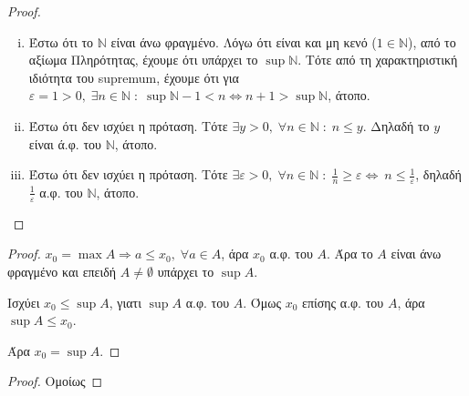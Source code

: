 \documentclass[main.tex]{subfiles}
\begin{document}
\begin{proof}
\item {}
    \begin{enumerate}[i)]
        \item Έστω ότι το $ \mathbb{N} $ είναι άνω φραγμένο. Λόγω ότι 
            είναι και μη κενό ($ 1 \in \mathbb{N} $), από το αξίωμα 
            Πληρότητας, έχουμε ότι υπάρχει το $ \sup \mathbb{N} $. 
            Τότε από τη χαρακτηριστική ιδιότητα του supremum, έχουμε 
            ότι για $ \varepsilon = 1 >0, \; \exists n \in \mathbb{N} 
            \; : \; \sup \mathbb{N}-1 < n \Leftrightarrow n+1 > \sup
            \mathbb{N} $, άτοπο.

        \item Έστω ότι δεν ισχύει η πρόταση. Τότε  $ \exists y >0, \; 
            \forall n \in \mathbb{N} \; : \; n \leq y$. Δηλαδή
            το  $y$  είναι ά.φ. του $\mathbb{N}$, άτοπο.

        \item Έστω ότι δεν ισχύει η πρόταση. Τότε $ \exists 
            \varepsilon >0 , \; \forall n \in \mathbb{N} \; : \; 
            \frac{1}{n} \geq \varepsilon  \Leftrightarrow \ n \leq 
            \frac{1}{\varepsilon} $, δηλαδή $ \frac{1}{\varepsilon} $ 
            α.φ. του $ \mathbb{N} $, άτοπο. 
    \end{enumerate}
\end{proof}


\begin{proof}
\item {}
    $ x_{0} = \max A \Rightarrow a \leq x_{0}, \; \forall a \in A $, άρα $ x_{0} $ α.φ. 
    του $A$. Άρα το $A$ είναι άνω φραγμένο και επειδή $ A \neq \emptyset $ υπάρχει 
    το $ \sup A $. 

    Ισχύει $ x_{0} \leq \sup A $, γιατι $ \sup A $ α.φ. του $A$.
    Όμως $ x_{0} $ επίσης α.φ. του $A$, άρα $ \sup A \leq x_{0} $.

    Άρα $ x_{0}= \sup A $.
\end{proof}


\begin{proof}
    Ομοίως 
\end{proof}
\end{document}
